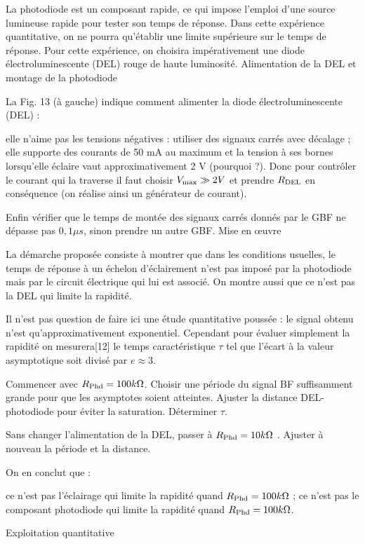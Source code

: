 \documentclass{article}%
\begin{document}
La photodiode est un composant rapide, ce qui impose l'emploi d'une source lumineuse rapide pour tester son temps de réponse. Dans cette expérience quantitative, on ne pourra qu'établir une limite supérieure sur le temps de réponse. Pour cette expérience, on choisira impérativement une diode électroluminescente (DEL) rouge de haute luminosité.
Alimentation de la DEL et montage de la photodiode

La Fig. 13 (à gauche) indique comment alimenter la diode électroluminescente (DEL) :

    elle n'aime pas les tensions négatives : utiliser des signaux carrés avec décalage ;
    elle supporte des courants de 50 mA au maximum et la tension à ses bornes lorsqu'elle éclaire vaut approximativement 2 V (pourquoi ?). Donc pour contrôler le courant qui la traverse il faut choisir $ V_{\rm max}\gg 2 V$ et prendre $R_{\rm DEL}$ en conséquence (on réalise ainsi un générateur de courant).

Enfin vérifier que le temps de montée des signaux carrés donnés par le GBF ne dépasse pas $0,1  \mu s$, sinon prendre un autre GBF.
Mise en œuvre

La démarche proposée consiste à montrer que dans les conditions usuelles, le temps de réponse à un échelon d'éclairement n'est pas imposé par la photodiode mais par le circuit électrique qui lui est associé. On montre aussi que ce n'est pas la DEL qui limite la rapidité.

Il n'est pas question de faire ici une étude quantitative poussée : le signal obtenu n'est qu'approximativement exponentiel. Cependant pour évaluer simplement la rapidité on mesurera[12] le temps caractéristique $\tau$ tel que l'écart à la valeur asymptotique soit divisé par $ e \approx 3$.

Commencer avec $ R_{\rm Phd} = 100 k\Omega$. Choisir une période du signal BF suffisamment grande pour que les asymptotes soient atteintes. Ajuster la distance DEL-photodiode pour éviter la saturation. Déterminer $ \tau$.

Sans changer l'alimentation de la DEL, passer à $R_{\rm Phd} = 10 {k}\Omega$ . Ajuster à nouveau la période et la distance.

On en conclut que :

    ce n'est pas l'éclairage qui limite la rapidité quand $ R_{\rm Phd} = 100 k \Omega$ ;
    ce n'est pas le composant photodiode qui limite la rapidité quand $ R_{\rm Phd} = 100 k\Omega$.

Exploitation quantitative
\end{document}
